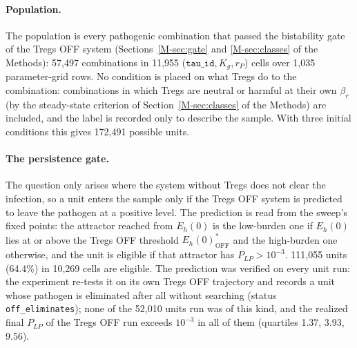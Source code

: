 \documentclass[11pt]{article}
\begin{document}
\paragraph{Population.} The population is every pathogenic combination that passed the
bistability gate of the Tregs OFF system (Sections~\ref{M-sec:gate} and \ref{M-sec:classes} of the Methods): 57{,}497 combinations in
11{,}955 ($\texttt{tau\_id}, K_g, r_P$) cells over 1{,}035 parameter-grid rows.
No condition is placed on what Tregs do to the combination: combinations in which Tregs
are neutral or harmful at their own $\beta_r$ (by the steady-state criterion of
Section~\ref{M-sec:classes} of the Methods) are included, and the label is recorded only to describe the
sample. With three
initial conditions this gives 172{,}491 possible units.

\paragraph{The persistence gate.} The question only arises where the system without Tregs
does not clear the infection, so a unit enters the sample only if the Tregs OFF system is
predicted to leave the pathogen at a positive level. The prediction is read from the sweep's
fixed points: the attractor reached from $E_h(0)$ is the low-burden one if $E_h(0)$ lies at or
above the Tregs OFF threshold $E_h(0)^*_{\mathrm{OFF}}$ and the high-burden one otherwise, and the
unit is eligible if that attractor has $P_{LP} > 10^{-3}$. 111{,}055 units (64.4\%) in
10{,}269 cells are eligible. The prediction was verified on every unit run: the
experiment re-tests it on its own Tregs OFF trajectory and records a unit whose pathogen is
eliminated after all without searching (status \texttt{off\_eliminates}); none of the 52{,}010
units run was of this kind, and the realized final $P_{LP}$ of the Tregs OFF run exceeds
$10^{-3}$ in all of them (quartiles 1.37, 3.93, 9.56).
\end{document}
